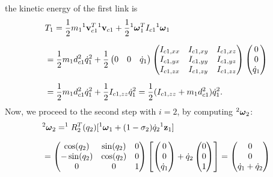 \documentclass[10pt, a4paper]{report}
\begin{document}
the kinetic energy of the first link is\begin{align}
    &T_1=
    \frac{1}{2}m_1{}^1\mathbf v_{c1}^T{}^1\mathbf v_{c1}+\frac{1}{2}{}^1{\boldsymbol{\omega}}_1^TI_{c1}{}^1{\boldsymbol{\omega}}_1\\[1.5ex]
    &=\frac{1}{2}m_1 d^2_{c1}\dot q^2_1+
    \frac{1}{2}\begin{pmatrix}
            0&0&\dot q_1
        \end{pmatrix}\begin{pmatrix}
       I_{c1,xx}&I_{c1,xy}&I_{c1,xz}\\
       I_{c1,yx}&I_{c1,yy}&I_{c1,yz}\\
       I_{c1,zx}&I_{c1,zy}&I_{c1,zz}\\
    \end{pmatrix}\begin{pmatrix}
            0\\0\\\dot q_1
        \end{pmatrix}\\[1.5ex] 
        &=
        \frac{1}{2}m_1 d^2_{c1}\dot q^2_1+
        \frac{1}{2}I_{c1,zz}\dot q_1^2=\frac{1}{2}(I_{c1,zz}+m_1 d^2_{c1})\dot q^2_1.
\end{align}
Now, we proceed to the second step with $i=2$, by computing ${}^2{\boldsymbol{\omega}}_2$:\begin{align}
    &{}^2{\boldsymbol{\omega}}_2=^{1}R^T_2(q_2)[{}^{1}{\boldsymbol{\omega}}_{1}+(1-\sigma_2)\dot q_2 {}^{1}\mathbf z_{1}]\\[1.5ex]
    &=\begin{pmatrix}
        \cos(q_2)&\sin(q_2)&0\\ 
        -\sin(q_2)&\cos(q_2)&0\\ 
        0&0&1
    \end{pmatrix}
    \left[
        \begin{pmatrix}
            0\\0\\\dot q_1
        \end{pmatrix}+\dot q_2 \begin{pmatrix}
            0\\0\\1
        \end{pmatrix}\right]= \begin{pmatrix}
            0\\0\\\dot q_1+\dot q_2
        \end{pmatrix}
\end{align}
\end{document}
